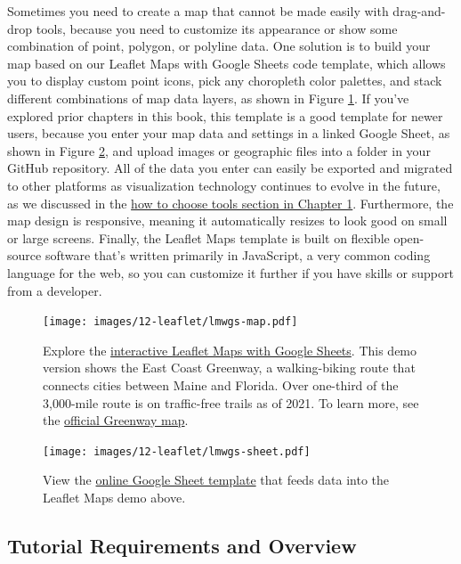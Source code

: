 \documentclass[
  english,
]{book}
\begin{document}
Sometimes you need to create a map that cannot be made easily with drag-and-drop tools, because you need to customize its appearance or show some combination of point, polygon, or polyline data. One solution is to build your map based on our Leaflet Maps with Google Sheets code template, which allows you to display custom point icons, pick any choropleth color palettes, and stack different combinations of map data layers, as shown in Figure \ref{fig:lmwgs-map}. If you've explored prior chapters in this book, this template is a good template for newer users, because you enter your map data and settings in a linked Google Sheet, as shown in Figure \ref{fig:lmwgs-sheet}, and upload images or geographic files into a folder in your GitHub repository. All of the data you enter can easily be exported and migrated to other platforms as visualization technology continues to evolve in the future, as we discussed in the \href{choose.html}{how to choose tools section in Chapter 1}. Furthermore, the map design is responsive, meaning it automatically resizes to look good on small or large screens. Finally, the Leaflet Maps template is built on flexible open-source software that's written primarily in JavaScript, a very common coding language for the web, so you can customize it further if you have skills or support from a developer.



\begin{figure}
\centering
\texttt{[image: images/12-leaflet/lmwgs-map.pdf]}
\caption{\label{fig:lmwgs-map}Explore the \href{https://handsondataviz.github.io/leaflet-maps-with-google-sheets/}{interactive Leaflet Maps with Google Sheets}. This demo version shows the East Coast Greenway, a walking-biking route that connects cities between Maine and Florida. Over one-third of the 3,000-mile route is on traffic-free trails as of 2021. To learn more, see the \href{https://www.greenway.org/route-map}{official Greenway map}.}
\end{figure}



\begin{figure}
\centering
\texttt{[image: images/12-leaflet/lmwgs-sheet.pdf]}
\caption{\label{fig:lmwgs-sheet}View the \href{https://docs.google.com/spreadsheets/d/1ZxvU8eGyuN9M8GxTU9acKVJv70iC3px_m3EVFsOHN9g}{online Google Sheet template} that feeds data into the Leaflet Maps demo above.}
\end{figure}

\hypertarget{tutorial-requirements-and-overview}{%
\subsection*{Tutorial Requirements and Overview}\label{tutorial-requirements-and-overview}}
\end{document}
